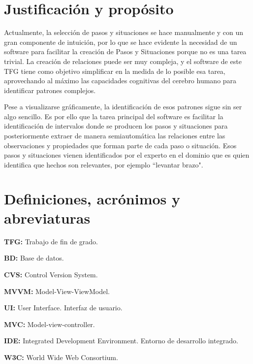 \section{Justificaci\'{o}n y prop\'osito}
Actualmente, la selecci\'on de pasos y situaciones se hace manualmente y con un gran componente de intuici\'on,
por lo que se hace evidente la necesidad de un software para facilitar la creaci\'on de Pasos y Situaciones porque
no es una tarea trivial. La creaci\'on de relaciones puede ser muy compleja, y el software de este TFG
tiene como objetivo simplificar en la medida de lo posible esa tarea, aprovechando al m\'aximo las capacidades
cognitivas del cerebro humano para identificar
patrones complejos. 

Pese a visualizarse gr\'aficamente, la identificaci\'on de esos patrones sigue sin ser algo sencillo. Es
por ello que la tarea principal del software es facilitar la identificaci\'on de intervalos donde se producen los
pasos y situaciones para posteriormente extraer de manera semiautom\'atica las relaciones entre las observaciones y
propiedades que forman parte de cada paso o situaci\'on. Esos pasos y situaciones vienen identificados por el
experto en el dominio que es quien identifica que hechos son relevantes, por ejemplo
``levantar brazo".

\section{Definiciones, acr\'{o}nimos y abreviaturas}
\textbf{TFG:} Trabajo de fin de grado.

\textbf{BD:} Base de datos.

\textbf{CVS:} Control Version System.

\textbf{MVVM:} Model-View-ViewModel.

\textbf{UI:} User Interface. Interfaz de usuario.

\textbf{MVC:} Model-view-controller.

\textbf{IDE:} Integrated Development Environment. Entorno de desarrollo integrado.

\textbf{W3C:} World Wide Web Consortium.
 
